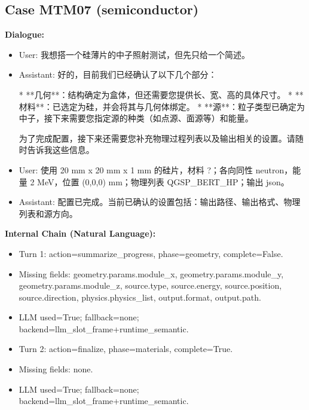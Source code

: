 \documentclass[11pt]{ctexart}
\begin{document}
\subsection{Case MTM07 (semiconductor)}
\textbf{Dialogue:}
\begin{itemize}
\item User: 我想搭一个硅薄片的中子照射测试，但先只给一个简述。
\item Assistant: 好的，目前我们已经确认了以下几个部分：

*   **几何**：结构确定为盒体，但还需要您提供长、宽、高的具体尺寸。
*   **材料**：已选定为硅，并会将其与几何体绑定。
*   **源**：粒子类型已确定为中子，接下来需要您指定源的种类（如点源、面源等）和能量。

为了完成配置，接下来还需要您补充物理过程列表以及输出相关的设置。请随时告诉我这些信息。
\item User: 使用 20 mm x 20 mm x 1 mm 的硅片，材料 ?；各向同性 neutron，能量 2 MeV，位置 (0,0,0) mm；物理列表 QGSP\_BERT\_HP；输出 json。
\item Assistant: 配置已完成。当前已确认的设置包括：输出路径、输出格式、物理列表和源方向。
\end{itemize}
\textbf{Internal Chain (Natural Language):}
\begin{itemize}
\item Turn 1: action=summarize\_progress, phase=geometry, complete=False.
\item Missing fields: geometry.params.module\_x, geometry.params.module\_y, geometry.params.module\_z, source.type, source.energy, source.position, source.direction, physics.physics\_list, output.format, output.path.
\item LLM used=True; fallback=none; backend=llm\_slot\_frame+runtime\_semantic.
\item Turn 2: action=finalize, phase=materials, complete=True.
\item Missing fields: none.
\item LLM used=True; fallback=none; backend=llm\_slot\_frame+runtime\_semantic.
\end{itemize}
\end{document}
